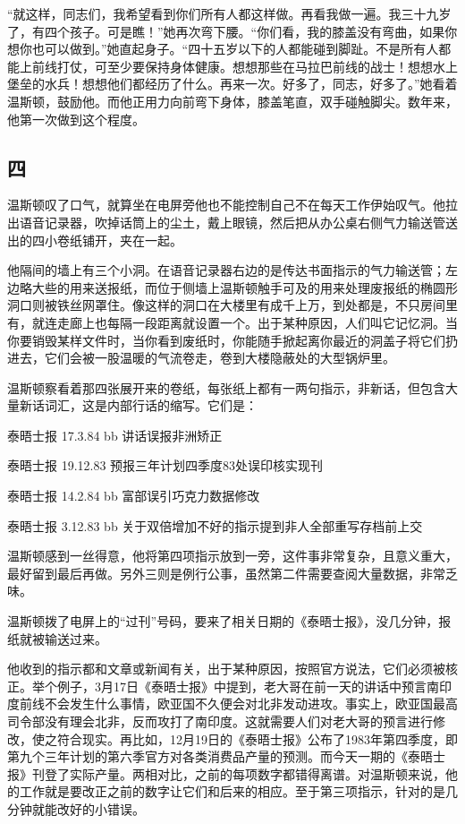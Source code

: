 ``就这样，同志们，我希望看到你们所有人都这样做。再看我做一遍。我三十九岁了，有四个孩子。可是瞧！''她再次弯下腰。``你们看，我的膝盖没有弯曲，如果你想你也可以做到。''她直起身子。``四十五岁以下的人都能碰到脚趾。不是所有人都能上前线打仗，可至少要保持身体健康。想想那些在马拉巴前线的战士！想想水上堡垒的水兵！想想他们都经历了什么。再来一次。好多了，同志，好多了。''她看着温斯顿，鼓励他。而他正用力向前弯下身体，膝盖笔直，双手碰触脚尖。数年来，他第一次做到这个程度。

\subsection{四}\label{ux56db}

温斯顿叹了口气，就算坐在电屏旁他也不能控制自己不在每天工作伊始叹气。他拉出语音记录器，吹掉话筒上的尘土，戴上眼镜，然后把从办公桌右侧气力输送管送出的四小卷纸铺开，夹在一起。

他隔间的墙上有三个小洞。在语音记录器右边的是传达书面指示的气力输送管；左边略大些的用来送报纸，而位于侧墙上温斯顿触手可及的用来处理废报纸的椭圆形洞口则被铁丝网罩住。像这样的洞口在大楼里有成千上万，到处都是，不只房间里有，就连走廊上也每隔一段距离就设置一个。出于某种原因，人们叫它记忆洞。当你要销毁某样文件时，当你看到废纸时，你能随手掀起离你最近的洞盖子将它们扔进去，它们会被一股温暖的气流卷走，卷到大楼隐蔽处的大型锅炉里。

温斯顿察看着那四张展开来的卷纸，每张纸上都有一两句指示，非新话，但包含大量新话词汇，这是内部行话的缩写。它们是：

泰晤士报 17.3.84 bb 讲话误报非洲矫正

泰晤士报 19.12.83 预报三年计划四季度83处误印核实现刊

泰晤士报 14.2.84 bb 富部误引巧克力数据修改

泰晤士报 3.12.83 bb 关于双倍增加不好的指示提到非人全部重写存档前上交

温斯顿感到一丝得意，他将第四项指示放到一旁，这件事非常复杂，且意义重大，最好留到最后再做。另外三则是例行公事，虽然第二件需要查阅大量数据，非常乏味。

温斯顿拨了电屏上的``过刊''号码，要来了相关日期的《泰晤士报》，没几分钟，报纸就被输送过来。

他收到的指示都和文章或新闻有关，出于某种原因，按照官方说法，它们必须被核正。举个例子，3月17日《泰晤士报》中提到，老大哥在前一天的讲话中预言南印度前线不会发生什么事情，欧亚国不久便会对北非发动进攻。事实上，欧亚国最高司令部没有理会北非，反而攻打了南印度。这就需要人们对老大哥的预言进行修改，使之符合现实。再比如，12月19日的《泰晤士报》公布了1983年第四季度，即第九个三年计划的第六季官方对各类消费品产量的预测。而今天一期的《泰晤士报》刊登了实际产量。两相对比，之前的每项数字都错得离谱。对温斯顿来说，他的工作就是要改正之前的数字让它们和后来的相应。至于第三项指示，针对的是几分钟就能改好的小错误。

